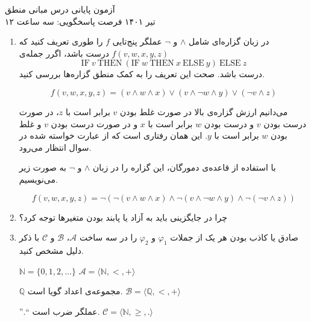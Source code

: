 \documentclass[12pt, 14paper]{article}
\begin{document}
\begin{center}
  {\Huge آزمون پایانی درس مبانی منطق}\\
  \vspace{5mm}
  ۱۲ تیر ۱۴۰۱ \quad \quad
  فرصت پاسخگویی: سه ساعت
\end{center}

\vspace{5mm}
\begin{enumerate}

\item در زبان گزاره‌ای شامل $\wedge$ و $\neg$ عملگر پنج‌تایی $f$ را طوری تعریف کنید که $f(v,w,x,y,z)$ 
درست باشد، اگرر جمله‌ی
$$\text{IF}~ v ~\text{THEN}~ (\text{IF}~ w ~\text{THEN}~ x ~\text{ELSE}~ y) ~\text{ELSE}~ z$$
درست باشد. صحت این تعریف را به کمک منطق گزاره‌ها بررسی کنید.
\begin{ans}
  $$ f(v, w, x, y, z) = (v \wedge w \wedge x) \vee (v \wedge \neg w \wedge y) \vee (\neg v \wedge z) $$

  می‌دانیم ارزش گزاره‌ی بالا در صورت غلط بودن $v$ برابر است با $z$، در صورت درست بودن $v$ و درست بودن $w$ برابر است با $x$ و در صورت درست بودن $v$ و غلط بودن $w$ برابر است با $y$. این همان رفتاری است که از عبارت خواسته شده در سوال انتظار می‌رود.

  با استفاده از قاعده‌ی دمورگان، این گزاره را در زبان $\wedge$ و $\neg$ به صورت زیر می‌نویسیم.

  $$ f(v, w, x, y, z) = \neg ( \neg (v \wedge w \wedge x) \wedge \neg (v \wedge \neg w \wedge y) \wedge \neg (\neg v \wedge z) )$$
\end{ans}


\item چرا در جایگزینی باید به آزاد یا پابند بودن متغیرها توجه کرد؟
\begin{ans}
  
\end{ans}

\item صادق یا کاذب بودن هر یک از جملات $\varphi_1$ و $\varphi_2$ را در سه ساخت $\mathcal{A}$، $\mathcal{B}$ و $\mathcal{C}$ با ذکر دلیل مشخص کنید.
\begin{flushleft}
  $\mathbb{N} = \{ 0, 1, 2, \dots\}$ \quad $\mathcal{A} = \langle \mathbb{N}, <, +\rangle$

  $\mathbb{Q} $ مجموعه‌ی اعداد گویا است. \quad $\mathcal{B} = \langle \mathbb{Q}, <, +\rangle$
  
  ''$.$`` عملگر ضرب است. \quad $\mathcal{C} = \langle \mathbb{N}, \ge, .\rangle$


\end{flushleft}
\end{enumerate}
\end{document}
